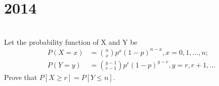 \section*{2014}
\vspace{-.5cm}
\hrulefill \smallskip\\
 Let the probability function of X and Y be 
\[ \begin{aligned}
    P(X=x) &= \binom{n}{x}p^x(1-p)^{n-x}, x = 0,1,\ldots,n; \\
    P(Y=y) &= \binom{y-1}{r -1}p^r(1-p)^{y-r}, y=r,r+1,\ldots
\end{aligned} \] Prove that $P[X \geq r] = P[Y\leq n]$.